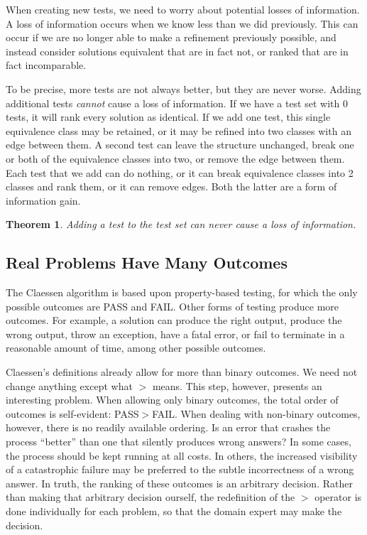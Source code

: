 \documentclass[11pt,twoside]{article}
\newtheorem{thm}{Theorem}
\theoremstyle{definition}
\begin{document}
When creating new tests, we need to worry about potential losses of information. A loss of information occurs when we know less than we did previously. This can occur if we are no longer able to make a refinement previously possible, and instead consider solutions equivalent that are in fact not, or ranked that are in fact incomparable.

To be precise, more tests are not always better, but they are never worse. Adding additional tests \emph{cannot} cause a loss of information. If we have a test set with 0 tests, it will rank every solution as identical. If we add one test, this single equivalence class may be retained, or it may be refined into two classes with an edge between them. A second test can leave the structure unchanged, break one or both of the equivalence classes into two, or remove the edge between them. Each test that we add can do nothing, or it can break equivalence classes into 2 classes and rank them, or it can remove edges. Both the latter are a form of information gain.


\begin{thm} Adding a test to the test set can never cause a loss of information.
\end{thm}

\subsection{Real Problems Have Many Outcomes}
The Claessen algorithm is based upon property-based testing, for which the only possible outcomes are PASS and FAIL. Other forms of testing produce more outcomes. For example, a solution can produce the right output, produce the wrong output, throw an exception, have a fatal error, or fail to terminate in a reasonable amount of time, among other possible outcomes.

Claessen's definitions already allow for more than binary outcomes. We need not change anything except what $>$ means. This step, however, presents an interesting problem. When allowing only binary outcomes, the total order of outcomes is self-evident: PASS$>$FAIL. When dealing with non-binary outcomes, however, there is no readily available ordering. Is an error that crashes the process ``better'' than one that silently produces wrong answers? In some cases, the process should be kept running at all costs. In others, the increased visibility of a catastrophic failure may be preferred to the subtle incorrectness of a wrong answer. In truth, the ranking of these outcomes is an arbitrary decision. Rather than making that arbitrary decision ourself, the redefinition of the $>$ operator is done individually for each problem, so that the domain expert may make the decision.
\end{document}
